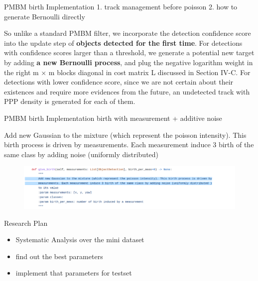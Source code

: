 \documentclass[aspectratio=169,xcolor=dvipsnames]{beamer}
\begin{document}
\begin{frame}{PMBM birth Implementation}
    1. track management before poisson
    2. how to generate Bernoulli directly
    \begin{block}{}
    So unlike a standard PMBM filter, we incorporate the detection confidence score into the update step 
    of \textbf{objects detected for the first time}. 
    For detections with confidence scores larger than a threshold, 
    we generate a potential new target by adding \textbf{a new Bernoulli process}, 
    and plug the negative logarithm weight in the right m × m blocks diagonal in cost matrix L 
    discussed in Section IV-C. For detections with lower confidence score, 
    since we are not certain about their existences and require more evidences from the future, 
    an undetected track with PPP density is generated for each of them.
    \href{https://www.researchgate.net/publication/355428771_3D_Multi-Object_Tracking_using_Random_Finite_Set-based_Multiple_Measurement_Models_Filtering_RFS-M_3_for_Autonomous_Vehicles}{}
    \end{block}
\end{frame}

\begin{frame}{PMBM birth Implementation}
    birth with measurement + additive noise
    \begin{block}{}
    Add new Gaussian to the mixture (which represent the poisson intensity). This birth process is driven by
    measurements. Each measurement induce 3 birth of the same class by adding noise (uniformly distributed)
    \href{https://github.com/quan-dao/pmbm-filter/blob/5cdf8b31665f1a7008afa963c1ab7c3b048b5856/poisson.py}{}
    \end{block}
    \begin{figure}
        \includegraphics[width=0.9\linewidth]{pmbm/1.png}
    \end{figure}
\end{frame}

\begin{frame}{Research Plan}
    \begin{itemize}
        \item{Systematic Analysis over the mini dataset}
        \item{find out the best parameters}
        \item{implement that parameters for testset}
    \end{itemize}
\end{frame}
\end{document}
